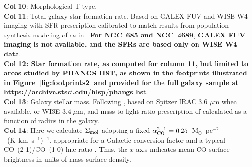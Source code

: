 \begin{table*}
\begin{tiny}
{\textbf{Col 10}: Morphological T-type.\\
\textbf{Col 11}: Total galaxy star formation rate. Based on GALEX FUV and WISE W4 imaging  with SFR prescription calibrated to match results  from population  synthesis  modeling  of \citep{salim16,salim18} as in \citet{phangs-alma}.  \textbf{For NGC~685 and NGC~4689, GALEX FUV imaging is not available, and the SFRs are based only on WISE W4 data.}\\
\textbf{{Col 12}: Star formation rate, as computed for column 11, but limited to areas studied by PHANGS-HST, as shown in the footprints illustrated in Figure~\ref{fig:footprints2} and provided for the full galaxy sample at \url{https://archive.stsci.edu/hlsp/phangs-hst}}.\\
\textbf{Col 13}: Galaxy stellar mass.  Following \citet{phangs-alma}, based on Spitzer IRAC 3.6 $\mu$m when available, or WISE 3.4 $\mu$m, and mass-to-light ratio prescription of \citep{leroy19} calculated as a function of radius in the galaxy.\\
\textbf{Col 14}: Here we calculate $\Sigma_{\rm mol}$ adopting a fixed $\alpha_{\rm CO}^{2-1} = 6.25$~M$_\odot$~pc$^{-2}$~(K~km~s$^{-1}$)$^{-1}$, appropriate for a Galactic conversion factor and a typical CO~(2-1)/CO~(1-0) line ratio \citep{sun18}. Thus, the $x$-axis indicates mean CO surface brightness in units of mass surface density.
}
\label{tab:galaxysample}
\end{tiny}

\end{table*}
